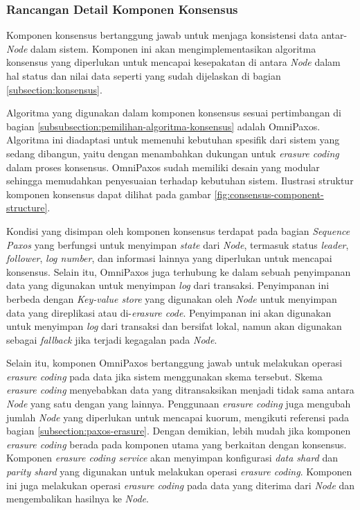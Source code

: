 \subsubsection{Rancangan Detail Komponen Konsensus}
\label{subsubsection:detail-komponen-konsensus}

Komponen konsensus bertanggung jawab untuk menjaga konsistensi data antar-\textit{Node} dalam sistem. Komponen ini akan mengimplementasikan algoritma konsensus yang diperlukan untuk mencapai kesepakatan di antara \textit{Node} dalam hal status dan nilai data seperti yang sudah dijelaskan di bagian \ref{subsection:konsensus}.

Algoritma yang digunakan dalam komponen konsensus sesuai pertimbangan di bagian \ref{subsubsection:pemilihan-algoritma-konsensus} adalah OmniPaxos. Algoritma ini diadaptasi untuk memenuhi kebutuhan spesifik dari sistem yang sedang dibangun, yaitu dengan menambahkan dukungan untuk \textit{erasure coding} dalam proses konsensus. OmniPaxos sudah memiliki desain yang modular sehingga memudahkan penyesuaian terhadap kebutuhan sistem. Ilustrasi struktur komponen konsensus dapat dilihat pada gambar \ref{fig:consensus-component-structure}.

Kondisi yang disimpan oleh komponen konsensus terdapat pada bagian \textit{Sequence Paxos} yang berfungsi untuk menyimpan \textit{state} dari \textit{Node}, termasuk status \textit{leader}, \textit{follower}, \textit{log number}, dan informasi lainnya yang diperlukan untuk mencapai konsensus. Selain itu, OmniPaxos juga terhubung ke dalam sebuah penyimpanan data yang digunakan untuk menyimpan \textit{log} dari transaksi. Penyimpanan ini berbeda dengan \textit{Key-value store} yang digunakan oleh \textit{Node} untuk menyimpan data yang direplikasi atau di-\textit{erasure code}. Penyimpanan ini akan digunakan untuk menyimpan \textit{log} dari transaksi dan bersifat lokal, namun akan digunakan sebagai \textit{fallback} jika terjadi kegagalan pada \textit{Node}.

Selain itu, komponen OmniPaxos bertanggung jawab untuk melakukan operasi \textit{erasure coding} pada data jika sistem menggunakan skema tersebut. Skema \textit{erasure coding} menyebabkan data yang ditransaksikan menjadi tidak sama antara \textit{Node} yang satu dengan yang lainnya. Penggunaan \textit{erasure coding} juga mengubah jumlah \textit{Node} yang diperlukan untuk mencapai kuorum, mengikuti referensi pada bagian \ref{subsection:paxos-erasure}. Dengan demikian, lebih mudah jika komponen \textit{erasure coding} berada pada komponen utama yang berkaitan dengan konsensus. Komponen \textit{erasure coding service} akan menyimpan konfigurasi \textit{data shard} dan \textit{parity shard} yang digunakan untuk melakukan operasi \textit{erasure coding}. Komponen ini juga melakukan operasi \textit{erasure coding} pada data yang diterima dari \textit{Node} dan mengembalikan hasilnya ke \textit{Node}.

